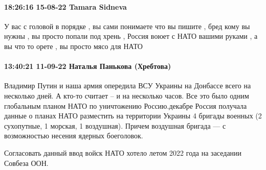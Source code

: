  
 
 
 
 

\paragraph{18:26:16 15-08-22 Tamara Sidneva}

У вас с головой в порядке , вы сами понимаете что вы пишите , бред кому вы
нужны , вы просто попали под хрень , Россия воюет с НАТО вашими руками , а вы
что то орете , вы просто мясо для НАТО

\paragraph{13:40:21 11-09-22 Наталья Панькова (Хребтова)}

Владимир Путин и наша армия опередила ВСУ Украины на Донбассе всего на
несколько дней. А кто-то считает – и на несколько часов. Все это было одним
глобальным планом НАТО по уничтожению Россию.декабре Россия получала данные о
планах НАТО разместить на территории Украины 4 бригады военных (2 сухопутные, 1
морская, 1 воздушная). Причем воздушная бригада — с возможностью несения
ядерных боеголовок.

Согласовать данный ввод войск НАТО хотело летом 2022 года на заседании Совбеза
ООН.
